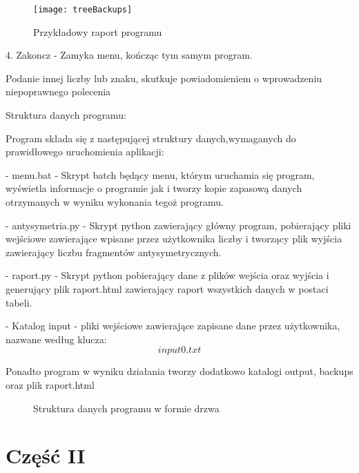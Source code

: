 \documentclass[12pt,a4paper]{article}
\begin{document}
\begin{figure}[htp]
    \centering
    \texttt{[image: treeBackups]}
    \caption{Przykładowy raport programu}
\end{figure}

4. Zakoncz - Zamyka menu, kończąc tym samym program.

	Podanie innej liczby lub znaku, skutkuje powiadomieniem o wprowadzeniu niepoprawnego
polecenia

Struktura danych programu:

Program składa się z następującej struktury danych,wymaganych do prawidłowego uruchomienia aplikacji:

- menu.bat - Skrypt batch będący menu, którym uruchamia się program, wyświetla informacje o programie jak i tworzy kopie zapasową danych otrzymanych w wyniku wykonania tegoż programu.

- antysymetria.py - Skrypt python zawierający główny program, pobierający pliki wejściowe zawierające wpisane przez użytkownika liczby i tworzący plik wyjścia zawierający liczbu fragmentów antysymetrycznych.

- raport.py - Skrypt python pobierający dane z plików wejścia oraz wyjścia i generujący plik raport.html zawierający raport wszystkich danych w postaci tabeli.

- Katalog input - pliki wejściowe zawierające zapisane dane przez użytkownika, nazwane według klucza:
\begin{equation}
     input0.txt
\end{equation}

Ponadto program w wyniku działania tworzy dodatkowo katalogi output, backups oraz plik raport.html\\

\begin{figure}[ht!]  
\vspace{-4ex} \centering {}  
\hspace{4ex}
\hspace{4ex}
\caption{ Struktura danych programu w formie drzwa} 
\end{figure}


	\section*{Część II}
\end{document}
